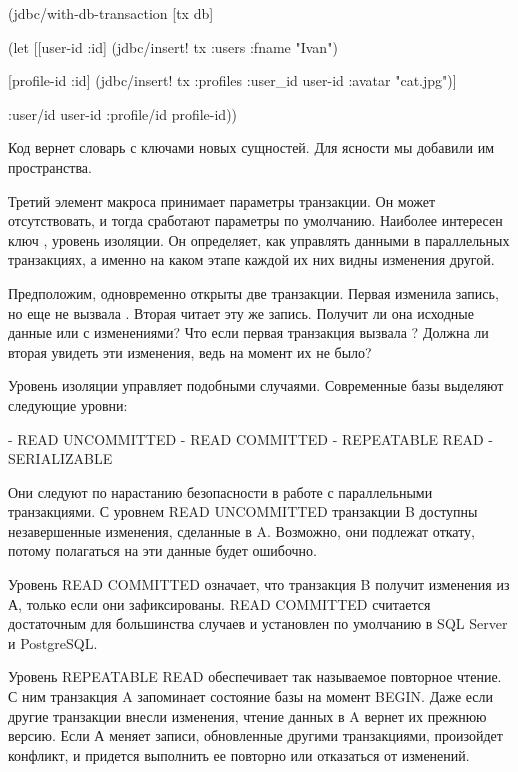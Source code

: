 \begin{english}
  \begin{clojure}
(jdbc/with-db-transaction [tx db]

  (let [[{user-id :id}]
        (jdbc/insert! tx :users {:fname "Ivan"})

        [{profile-id :id}]
        (jdbc/insert! tx :profiles {:user_id user-id :avatar "cat.jpg"})]

    {:user/id user-id
     :profile/id profile-id}))
  \end{clojure}
\end{english}

Код вернет словарь с ключами новых сущностей. Для ясности мы добавили им пространства.

Третий элемент макроса принимает параметры транзакции. Он может отсутствовать, и тогда сработают параметры по умолчанию. Наиболее интересен ключ , уровень изоляции. Он определяет, как управлять данными в параллельных транзакциях, а именно на каком этапе каждой их них видны изменения другой.

Предположим, одновременно открыты две транзакции. Первая изменила запись, но еще не вызвала . Вторая читает эту же запись. Получит ли она исходные данные или с изменениями? Что если первая транзакция вызвала ? Должна ли вторая увидеть эти изменения, ведь на момент  их не было?

Уровень изоляции управляет подобными случаями. Современные базы выделяют следующие уровни:

- READ UNCOMMITTED
- READ COMMITTED
- REPEATABLE READ
- SERIALIZABLE

Они следуют по нарастанию безопасности в работе с параллельными транзакциями. С уровнем READ UNCOMMITTED транзакции B доступны незавершенные изменения, сделанные в A. Возможно, они подлежат откату, потому полагаться на эти данные будет ошибочно.

Уровень READ COMMITTED означает, что транзакция B получит изменения из А, только если они зафиксированы. READ COMMITTED считается достаточным для большинства случаев и установлен по умолчанию в SQL Server и PostgreSQL.

Уровень REPEATABLE READ обеспечивает так называемое повторное чтение. С ним транзакция A запоминает состояние базы на момент BEGIN. Даже если другие транзакции внесли изменения, чтение данных в A вернет их прежнюю версию. Если А меняет записи, обновленные другими транзакциями, произойдет конфликт, и придется выполнить ее повторно или отказаться от изменений.

